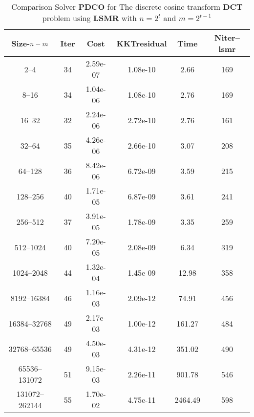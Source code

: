 \documentclass[letterpaper,12pt,oneside,final]{book}
\begin{document}
\begin{table}
\caption{Comparison Solver  {\bf PDCO}  for  The discrete cosine transform {\bf DCT} problem using {\bf LSMR} with $n=2^{t}$ and $m=2^{t-1}$} 
\begin{center}
\begin{tabular}{|*{6}{c}|} \hline
Size-$n\--m$ & \multicolumn{1}{c}{Iter} & \multicolumn{1}{c}{Cost} & \multicolumn{1}{c}{KKTresidual} & \multicolumn{1}{c}{Time} & \multicolumn{1}{c|}{Niter--lsmr} \\
\hline
2--4 &34& 2.59e-07& 1.08e-10& 2.66& 169 \\ 
8--16 &34& 1.04e-06& 1.08e-10& 2.76& 169 \\ 
16--32 &32& 2.24e-06& 2.72e-10& 2.76& 161 \\  
32--64 &35& 4.26e-06& 2.66e-10& 3.07& 208 \\ 
64--128 &36& 8.42e-06& 6.72e-09& 3.59& 215 \\ 
128--256 &40& 1.71e-05& 6.87e-09& 3.61& 241 \\ 
256--512 &37& 3.91e-05& 1.78e-09& 3.35& 259 \\ 
512--1024 &40& 7.20e-05& 2.08e-09& 6.34& 319 \\ 
1024--2048 &44& 1.32e-04& 1.45e-09& 12.98& 358 \\ 
8192--16384 &46& 1.16e-03& 2.09e-12& 74.91& 456 \\ 
16384--32768 &49& 2.17e-03& 1.00e-12& 161.27& 484 \\ 
32768--65536 &49& 4.50e-03& 4.31e-12& 351.02& 490 \\ 
65536--131072 &51& 9.15e-03& 2.26e-11& 901.78& 546 \\ 
131072--262144 &55& 1.70e-02& 4.75e-11& 2464.49& 598 \\
\hline
\end{tabular}
\end{center}
\end{table}
\end{document}
